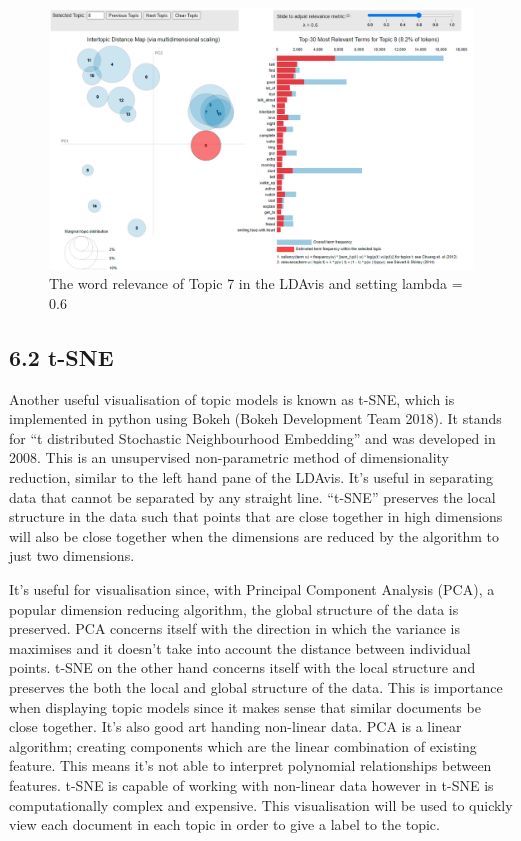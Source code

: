 \documentclass[
]{article}
\begin{document}
\begin{figure}

{\centering \includegraphics[width=1\linewidth]{images/ldavis2} 

}

\caption{The word relevance of Topic 7 in the LDAvis and setting lambda = 0.6}\label{fig:ldavis2}
\end{figure}

\hypertarget{t-sne}{%
\subsection{6.2 t-SNE}\label{t-sne}}

Another useful visualisation of topic models is known as t-SNE, which is
implemented in python using Bokeh (Bokeh Development Team 2018). It
stands for ``t distributed Stochastic Neighbourhood Embedding'' and was
developed in 2008. This is an unsupervised non-parametric method of
dimensionality reduction, similar to the left hand pane of the LDAvis.
It's useful in separating data that cannot be separated by any straight
line. ``t-SNE'' preserves the local structure in the data such that
points that are close together in high dimensions will also be close
together when the dimensions are reduced by the algorithm to just two
dimensions.

It's useful for visualisation since, with Principal Component Analysis
(PCA), a popular dimension reducing algorithm, the global structure of
the data is preserved. PCA concerns itself with the direction in which
the variance is maximises and it doesn't take into account the distance
between individual points. t-SNE on the other hand concerns itself with
the local structure and preserves the both the local and global
structure of the data. This is importance when displaying topic models
since it makes sense that similar documents be close together. It's also
good art handing non-linear data. PCA is a linear algorithm; creating
components which are the linear combination of existing feature. This
means it's not able to interpret polynomial relationships between
features. t-SNE is capable of working with non-linear data however in
t-SNE is computationally complex and expensive. This visualisation will
be used to quickly view each document in each topic in order to give a
label to the topic.
\end{document}
